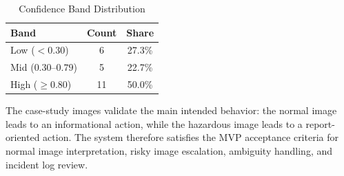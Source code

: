 \begin{table}[H]
\centering
\caption{Confidence Band Distribution}
\begin{tabular}{|l|c|c|}
\hline
\textbf{Band} & \textbf{Count} & \textbf{Share} \\ \hline
Low ($<0.30$) & 6 & 27.3\% \\ \hline
Mid ($0.30$--$0.79$) & 5 & 22.7\% \\ \hline
High ($\geq0.80$) & 11 & 50.0\% \\ \hline
\end{tabular}
\end{table}

The case-study images validate the main intended behavior: the normal image leads to an informational action, while the hazardous image leads to a report-oriented action. The system therefore satisfies the MVP acceptance criteria for normal image interpretation, risky image escalation, ambiguity handling, and incident log review.
